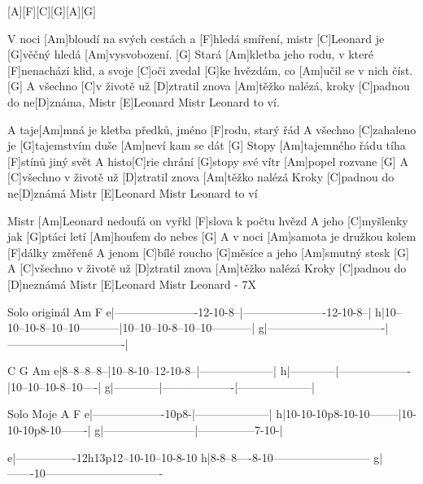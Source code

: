 [A][F][C][G][A][G]

V noci [Am]bloudí na svých cestách a [F]hledá smíření,
mistr [C]Leonard je [G]věčný hledá [Am]vysvobození. [G]
Stará [Am]kletba jeho rodu, v které [F]nenachází klid,
a svoje [C]oči zvedal [G]ke hvězdám, co [Am]učil se v nich číst. [G]
A všechno [C]v životě už [D]ztratil znova [Am]těžko nalézá,
kroky [C]padnou do ne[D]známa, Mistr [E]Leonard
Mistr Leonard to ví.


A taje[Am]mná je kletba předků, jméno [F]rodu, starý řád
A všechno [C]zahaleno je [G]tajemstvím duše [Am]neví kam se dát [G]
Stopy [Am]tajemného řádu tíha [F]stínů jiný svět
A histo[C]rie chrání [G]stopy své vítr [Am]popel rozvane [G]
A [C]všechno v životě už [D]ztratil znova [Am]těžko nalézá
Kroky [C]padnou do ne[D]známá Mistr [E]Leonard
Mistr Leonard to ví


Mistr [Am]Leonard nedoufá on vyřkl [F]slova k počtu hvězd
A jeho [C]myšlenky jak [G]ptáci letí [Am]houfem do nebes [G]
A v noci [Am]samota je družkou kolem [F]dálky změřené
A jenom [C]bílé roucho [G]měsíce a jeho [Am]smutný stesk [G]
A [C]všechno v životě už [D]ztratil znova [Am]těžko nalézá
Kroky [C]padnou do [D]neznámá Mistr [E]Leonard
Mistr Leonard - 7X


\btab
Solo originál
  Am                              F
e|----------------------12-10-8--|----------------------12-10-8--|
h|10--10--10-8--10--10-----------|10--10--10-8--10--10-----------|
g|-------------------------------|-------------------------------|

  C            G                   Am
e|8--8--8--8--|10--8-10--12-10-8--|--------------------|
h|------------|-------------------|10--10--10-8--10----|
g|------------|-------------------|--------------------|

Solo Moje
  A                        F
e|-------------------10p8-|--------------------|
h|10-10-10p8-10-10--------|10-10-10p8-10-------|
g|------------------------|---------------7-10-|

e|----------------12h13p12--10-10--10-8-10
h|8-8--8----8-10--------------------------
g|-------10-------------------------------
\etab


